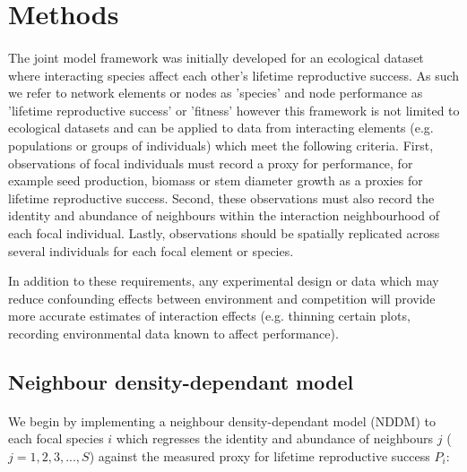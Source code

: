\documentclass[a4,12pt]{article}
\begin{document}
    
\section{Methods}

    
    \paragraph{}
    The joint model framework was initially developed for an ecological dataset where interacting species affect each other's lifetime reproductive success. As such we refer to network elements or nodes as 'species' and node performance as 'lifetime reproductive success' or 'fitness' however this framework is not limited to ecological datasets and can be applied to data from interacting elements (e.g. populations or groups of individuals) which meet the following criteria. First,   observations of focal individuals must record a proxy for performance, for example seed production, biomass or stem diameter growth as a proxies for lifetime reproductive success. Second,  these observations must also record the identity and abundance of neighbours within the interaction neighbourhood of each focal individual. Lastly, observations should be spatially replicated across several individuals for each focal element or species.


    In addition to these requirements, any experimental design or data which may reduce confounding effects between environment and competition will provide more accurate estimates of interaction effects (e.g. thinning certain plots, recording environmental data known to affect performance). 
    
    \subsection{Neighbour density-dependant model}
        
        \paragraph{}
        We begin by implementing a neighbour density-dependant model (NDDM) to each focal species $i$ which regresses the identity and abundance of neighbours $j$ ($j = 1, 2, 3, ..., S$) against the measured proxy for lifetime reproductive success $P_{i}$:
        
\end{document}
